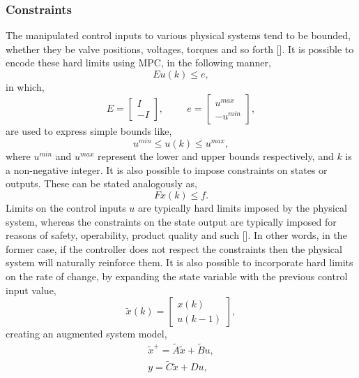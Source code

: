 \subsubsection{Constraints}

The manipulated control inputs to various physical systems tend to be bounded, whether they be valve positions, voltages, torques and so forth [\citeauthor{Rawlings2012}]. It is possible to encode these hard limits using \gls{MPC}, in the following manner,
\begin{equation}
Eu(k) \leq e,
\end{equation}
in which,
\begin{equation}
E = \left[ \begin{array}{cc}
I\\ -I
\end{array} \right],
\hspace{1cm}
e = \left[\begin{array}{cc}
u^{max} \\-u^{min}
\end{array} \right],
\end{equation} 
are used to express simple bounds like,
\begin{equation}
u^{min} \leq u(k) \leq u^{max},
\end{equation}
where $u^{min}$ and $u^{max}$ represent the lower and upper bounds respectively, and $k$ is a non-negative integer. It is also possible to impose constraints on states or outputs. These can be stated analogously as,
\begin{equation}
Fx(k) \leq f.
\end{equation}
Limits on the control inputs $u$ are typically hard limits imposed by the physical system, whereas the constraints on the state output are typically imposed for reasons of safety, operability, product quality and such [\citeauthor{Rawlings2012}]. In other words, in the former case, if the controller does not respect the constraints then the physical system will naturally reinforce them. It is also possible to incorporate hard limits on the rate of change, by expanding the state variable with the previous control input value,
\begin{equation}
\tilde{x}(k) = \left[\begin{array}{cc}
x(k)\\ u(k-1)
\end{array}\right],
\end{equation}
creating an augmented system model,
\begin{align}
\tilde{x}^+ = \tilde{A}\tilde{x} + \tilde{B}u, \\
y = \tilde{C}\tilde{x} + Du,
\end{align}
